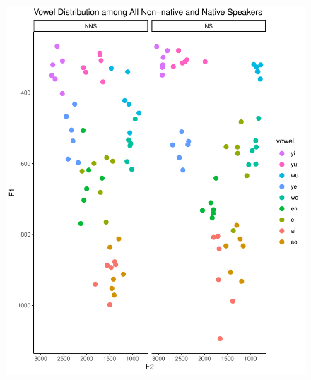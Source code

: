 \documentclass[man, fleqn, noextraspace]{apa6}
\begin{document}
\begin{figure}
\centering
\includegraphics{Vowel_v2_files/figure-latex/figure1-1.pdf}
\caption{}
\end{figure}
\end{document}
